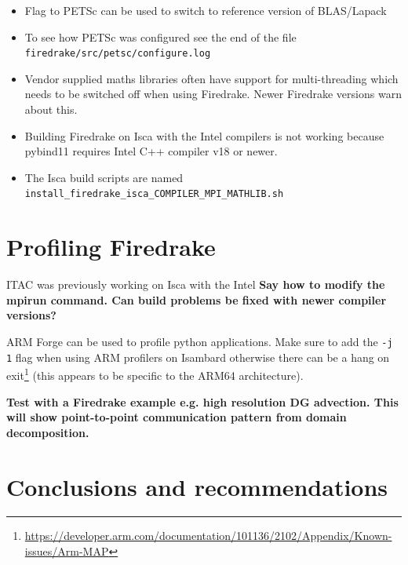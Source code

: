 \documentclass[a4paper,titlepage]{article}
\begin{document}
\begin{itemize}
\item Flag to PETSc can be used to switch to reference version of BLAS/Lapack
\item To see how PETSc was configured see the end of the file \texttt{firedrake/src/petsc/configure.log}

\item Vendor supplied maths libraries often have support for multi-threading which needs to be switched off when using Firedrake. Newer Firedrake versions warn about this.

\item Building Firedrake on Isca with the Intel compilers is not working because pybind11 requires Intel C++ compiler v18 or newer. 

\item The Isca build scripts are named \verb+install_firedrake_isca_COMPILER_MPI_MATHLIB.sh+
\end{itemize}


\section{Profiling Firedrake}
\label{section:profiling_firedrake}

ITAC was previously working on Isca with the Intel \textbf{Say how to modify the mpirun command. Can build problems be fixed with newer compiler versions?}

ARM Forge can be used to profile python applications. Make sure to add the \verb+-j 1+ flag when using ARM profilers on Isambard otherwise there can be a hang on exit\footnote{\url{https://developer.arm.com/documentation/101136/2102/Appendix/Known-issues/Arm-MAP}} (this appears to be specific to the ARM64 architecture).

\textbf{Test with a Firedrake example e.g. high resolution DG advection. This will show point-to-point communication pattern from domain decomposition.}


\section{Conclusions and recommendations}
\label{section:conclusions}
\end{document}
